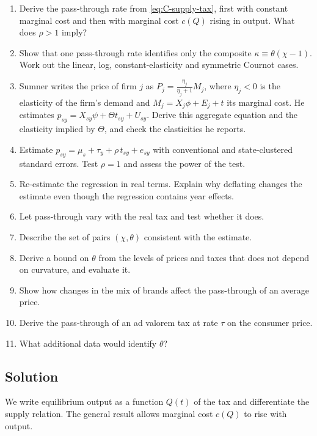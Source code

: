 \begin{enumerate}[label=(\alph*)]
\item Derive the pass-through rate from \eqref{eq:C-supply-tax}, first with constant marginal cost and then with
  marginal cost $c(Q)$ rising in output. What does $\rho > 1$ imply?
\item Show that one pass-through rate identifies only the composite $\kappa \equiv \theta(\chi - 1)$. Work out the
  linear, log, constant-elasticity and symmetric Cournot cases.
\item Sumner writes the price of firm $j$ as $P_j = \frac{\eta_j}{\eta_j + 1}M_j$, where $\eta_j < 0$ is the
  elasticity of the firm's demand and $M_j = X_j\phi + E_j + t$ its marginal cost. He estimates
  $p_{sy} = X_{sy}\psi + \Theta t_{sy} + U_{sy}$. Derive this aggregate equation and the elasticity implied by
  $\Theta$, and check the elasticities he reports.
\item Estimate $p_{sy} = \mu_s + \tau_y + \rho\,t_{sy} + e_{sy}$ with conventional and state-clustered standard errors.
  Test $\rho = 1$ and assess the power of the test.
\item Re-estimate the regression in real terms. Explain why deflating changes the estimate even though the
  regression contains year effects.
\item Let pass-through vary with the real tax and test whether it does.
\item Describe the set of pairs $(\chi, \theta)$ consistent with the estimate.
\item Derive a bound on $\theta$ from the levels of prices and taxes that does not depend on curvature, and
  evaluate it.
\item Show how changes in the mix of brands affect the pass-through of an average price.
\item Derive the pass-through of an ad valorem tax at rate $\tau$ on the consumer price.
\item What additional data would identify $\theta$?
\end{enumerate}

\subsection{Solution}\label{sec:C-passthrough-solution}

We write equilibrium output as a function $Q(t)$ of the tax and differentiate the supply relation. The general
result allows marginal cost $c(Q)$ to rise with output.

